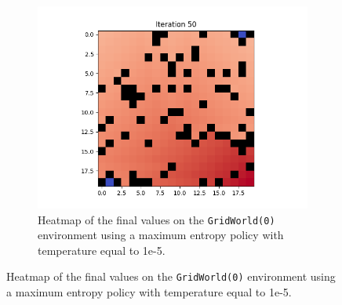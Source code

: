 \documentclass{article}
\begin{document}
\begin{enumerate}[(a)]
\begin{figure}[h!]
\begin{subfigure}{0.3\textwidth}
    \end{subfigure}
    \hspace{0.1 in}
     \begin{subfigure}{0.3\textwidth}
        \centering
        \includegraphics[width=\textwidth]{figures/part_1_b_t1e-5.png}
        \caption{Heatmap of the final values on the \texttt{GridWorld(0)} environment using a maximum entropy policy with temperature equal to 1e-5.}
    \end{subfigure}
\end{figure}
\vspace{-0.1 in}


\end{enumerate}
\end{document}

